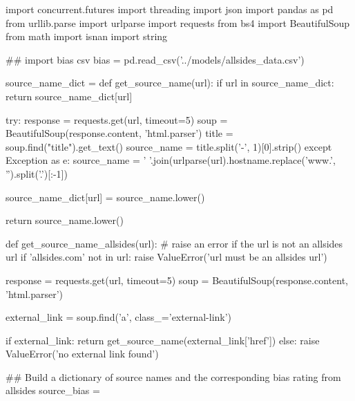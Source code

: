 
\begin{pyin}
import concurrent.futures
import threading
import json
import pandas as pd
from urllib.parse import urlparse
import requests
from bs4 import BeautifulSoup
from math import isnan
import string
\end{pyin}

\begin{pyin}
\## import bias csv
bias = pd.read_csv('../models/allsides_data.csv')
\end{pyin}

\begin{pyin}
source_name_dict = {}
def get_source_name(url):
    if url in source_name_dict:
        return source_name_dict[url]

    try:
        response = requests.get(url, timeout=5)
        soup = BeautifulSoup(response.content, 'html.parser')
        title = soup.find("title").get_text()
        source_name = title.split('-', 1)[0].strip()
    except Exception as e:
        source_name = ' '.join(urlparse(url).hostname.replace('www.', '').split('.')[:-1])

    source_name_dict[url] = source_name.lower()

    return source_name.lower()
\end{pyin}

\begin{pyin}
def get_source_name_allsides(url):
    # raise an error if the url is not an allsides url
    if 'allsides.com' not in url:
        raise ValueError('url must be an allsides url')

    response = requests.get(url, timeout=5)
    soup = BeautifulSoup(response.content, 'html.parser')

    external_link = soup.find('a', class_='external-link')

    if external_link:
        return get_source_name(external_link['href'])
    else:
        raise ValueError('no external link found')
\end{pyin}

\begin{pyin}
\## Build a dictionary of source names and the corresponding bias rating from allsides
source_bias = {}
\end{pyin}

